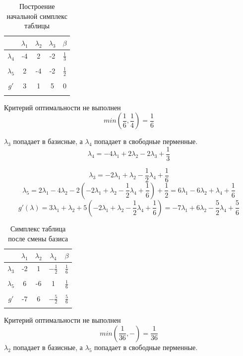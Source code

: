 \documentclass{article}
\begin{document}
\begin{table}[H]
    \centering
    \caption{Построение начальной симплекс таблицы}
    \begin{tabular}{|c|c|c|c|c|}
    \hline
    &$\lambda_1$&$\lambda_2$&$\lambda_3$&$\beta$\\\hline
    $\lambda_4$&-4&2&-2&$\frac{1}{3}$\\
    &&&&\\\hline
    $\lambda_5$&2&-4&-2&$\frac{1}{2}$\\
    &&&&\\\hline
    $g'$&3&1&5&0\\
    &&&&\\\hline
    \end{tabular}
\end{table}
Критерий оптимальности не выполнен 
\[min(\frac{1}{6}, \frac{1}{4}) = \frac{1}{6}\]



 $\lambda_3$ попадает в базисные, а $\lambda_4$ попадает в свободные перменные.
\[\lambda_4 = -4\lambda_1+2\lambda_2-2\lambda_3+\frac{1}{3}\]

\[\lambda_3 = -2\lambda_1+\lambda_2-\frac{1}{2}\lambda_4+\frac{1}{6}\]
\[\lambda_5 = 2\lambda_1-4\lambda_2-2(-2\lambda_1+\lambda_2-\frac{1}{2}\lambda_4+\frac{1}{6}) + \frac{1}{2} = 
6\lambda_1-6\lambda_2+\lambda_4+\frac{1}{6}\]
\[g'(\lambda) = 3\lambda_1 + \lambda_2 + 5(-2\lambda_1+\lambda_2-\frac{1}{2}\lambda_4+\frac{1}{6}) = 
-7\lambda_1+6\lambda_2-\frac{5}{2}\lambda_4+\frac{5}{6}\]

\begin{table}[H]
    \centering
    \caption{Симплекс таблица после смены базиса}
    \begin{tabular}{|c|c|c|c|c|}
    \hline
    &$\lambda_1$&$\lambda_2$&$\lambda_4$&$\beta$\\\hline
    $\lambda_3$&-2&1&$-\frac{1}{2}$&$\frac{1}{6}$\\
    &&&&\\\hline
    $\lambda_5$&6&-6&1&$\frac{1}{6}$\\
    &&&&\\\hline
    $g'$&-7&6&$-\frac{5}{2}$&$\frac{5}{6}$\\
    &&&&\\\hline
    \end{tabular}
\end{table}
Критерий оптимальности не выполнен 
\[min(\frac{1}{36}, -) = \frac{1}{36}\]
$\lambda_2$ попадает в базисные, а $\lambda_5$ попадает в свободные перменные.
\end{document}
